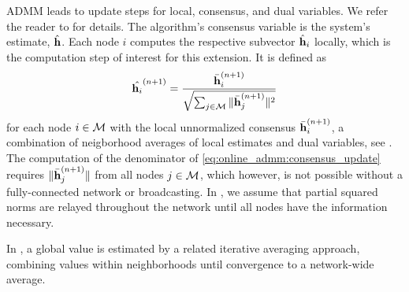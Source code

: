 \documentclass{article}
\begin{document}
ADMM leads to update steps for local, consensus, and dual variables.
We refer the reader to \cite{blochbergerDBSI} for details.
The algorithm's consensus variable is the system's estimate, \(\hat{\bm{\mathrm{h}}}\).
Each node \(i\) computes the respective subvector \(\hat{\bm{\mathrm{h}}}_i\) locally, which is the computation step of interest for this extension.
It is defined as
\begin{equation}
    \hat{\bm{\mathrm{h}}_i}^{(n+1)} = \frac{\bar{\bm{\mathrm{h}}}_i^{(n+1)}}{\sqrt{\sum_{j \in \mathcal{M}} \|\bar{\bm{\mathrm{h}}}_j^{(n+1)}\|^2}}\label{eq:online_admm:consensus_update}
\end{equation}
for each node \(i \in \mathcal{M}\) with the local unnormalized consensus \(\bar{\bm{\mathrm{h}}}_i^{(n+1)}\), a combination of neigborhood averages of local estimates and dual variables, see \cite{blochbergerDBSI}.
The computation of the denominator of \eqref{eq:online_admm:consensus_update} requires  \(\|\bar{\bm{\mathrm{h}}}_j^{(n+1)}\|\) from all nodes \(j \in \mathcal{M}\), which however, is not possible without a fully-connected network or broadcasting.
In \cite{blochbergerDBSI}, we assume that partial squared norms are relayed throughout the network until all nodes have the information necessary.

In \cite{yuDistributedBlindSystem2014,liuDistributedBlindIdentification2016},
a global value is estimated by a related iterative averaging approach, combining values within neighborhoods until convergence to a network-wide average.
\end{document}
